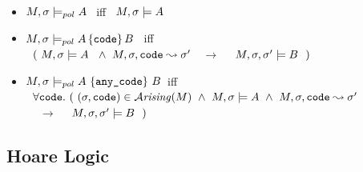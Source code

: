 \setcounter{definition}{14}
\begin{definition} ~ ~ %

\begin{itemize}
\item
$M,\sigma  \models_{pol} A$   \  iff \ 
$M, \sigma \models A$
\item
$M,\sigma    \models_{pol} A\, \{ {\textrm{\ttfamily{code}}} \}\, B$ \  iff \\ 
 $ ~ $ \hspace{.2in} 
 $(\ M, \sigma \models A\ \ \wedge\  M, \sigma, {\textrm{\ttfamily{code}}}  \leadsto \sigma' $ %
 $ \ \ \  \longrightarrow $ 
$  \ \ \ \M, \sigma, \sigma' \models \B\ \ )$
\item
{$M, \sigma \models_{pol} A \ \{ {\textrm{\ttfamily{any\_code}}} \}\ B$\ iff} \\
 $ ~ $ \hspace{.2in}  $ \forall {\ensuremath{\textrm{\ttfamily{code}}}}.\ (\  (\sigma,{\textrm{\ttfamily{code}}} )\in {\mathcal{A}}\textrm{\textit{rising}}(M)\ \wedge\  M, \sigma \models A\  \wedge\  M, \sigma, {\textrm{\ttfamily{code}}}  \leadsto  \sigma' $ \\
  $ ~ $   \hspace{.6in}  $ \ \ \  \longrightarrow $
   $\ \ \ \M, \sigma, \sigma' \models \B\ \ )$
\end{itemize}
\end{definition}

%


\subsection{Hoare Logic}

